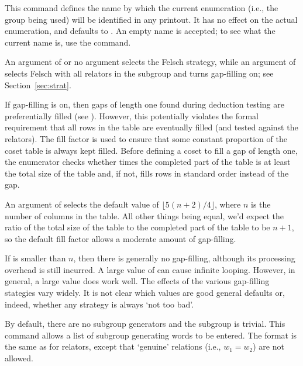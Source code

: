 \quad{}

This command defines the name by which the current enumeration (i.e.,
  the group being used) will be identified in any printout.
It has no effect on the actual enumeration, and defaults to .
An empty name is accepted; to see what the current name is, use the
   command.

\quad{}

An argument of  or no argument selects the Felsch strategy, while
  an argument of  selects Felsch with all relators in the subgroup
  and turns gap-filling on; see Section~\ref{sec:strat}.

\quad{}

If gap-filling is on, then gaps of length one found during deduction
  testing are preferentially filled (see \cite{Hav}).
However, this potentially violates the formal requirement that all rows
  in the table are eventually filled (and tested against the relators).
The fill factor is used to ensure that some constant proportion of the
  coset table is always kept filled.
Before defining a coset to fill a gap of length one, the enumerator checks 
  whether  times the completed part of the table is at least the
  total size of the table and, if not, fills rows in standard order
  instead of the gap.

An argument of  selects the default value of
  $\lfloor 5(n+2)/4 \rfloor$, where $n$ is the number of columns in the
  table.
All other things being equal, we'd expect the ratio of the total size
  of the table to the completed part of the table to be $n+1$, so the 
  default fill factor allows a moderate amount of gap-filling.

If  is smaller than $n$, then there is generally no gap-filling,
  although its processing overhead is still incurred.
A large value of  can cause infinite looping.
However, in general, a large value does work well.
The effects of the various gap-filling stategies vary widely.  
It is not clear which values are good general defaults or, indeed, whether
  any strategy is always `not too bad'\kern-1.5pt.

\quad{}

By default, there are no subgroup generators and the subgroup is trivial.
This command allows a list of subgroup generating words to be entered.
The format is the same as for relators, except that `genuine' relations
  (i.e., $w_1 = w_2$) are not allowed.

